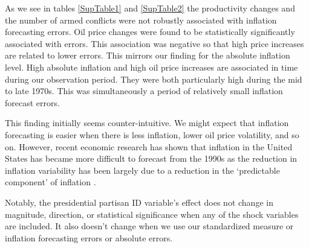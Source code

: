 \documentclass[a4paper]{article}\usepackage[]{graphicx}\usepackage[]{color}
\begin{document}
As we see in tables \ref{SupTable1} and \ref{SupTable2} the productivity changes and the number of armed conflicts were not robustly associated with inflation forecasting errors. Oil price changes were found to be statistically significantly associated with errors. This association was negative so that high price increases are related to lower errors. This mirrors our finding for the absolute inflation level. High absolute inflation and high oil price increases are associated in time during our observation period. They were both particularly high during the mid to late 1970s. This was simultaneously a period of relatively small inflation forecast errors. 

This finding initially seems counter-intuitive. We might expect that inflation forecasting is easier when there is less inflation, lower oil price volatility, and so on. However, recent economic research has shown that inflation in the United States has became more difficult to forecast from the 1990s as the reduction in inflation variability has been largely due to a reduction in the `predictable component' of inflation \citep[see][]{Gamber2009}. 

Notably, the presidential partisan ID variable's effect does not change in magnitude, direction, or statistical significance when any of the shock variables are included. It also doesn't change when we use our standardized measure or inflation forecasting errors or absolute errors.
\end{document}
